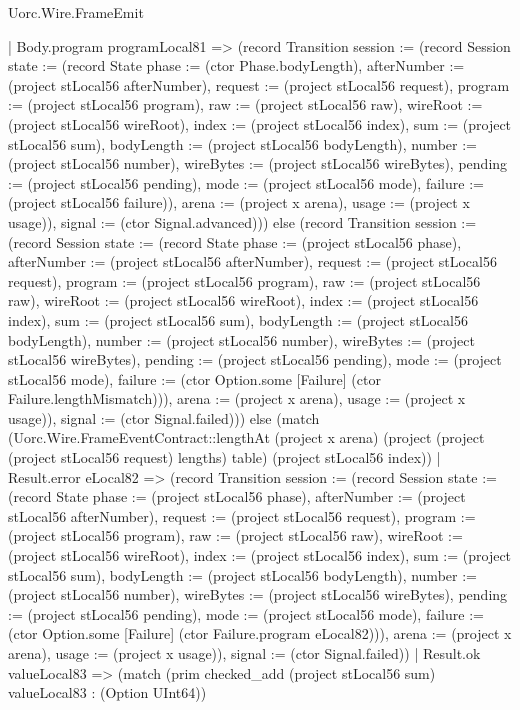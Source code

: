 \begin{lexlean}{Uorc.Wire.FrameEmit}
\begin{semanticmodule}
{          | Body.program programLocal81 => (record Transition {session := (record Session {state := (record State {phase := (ctor Phase.bodyLength), afterNumber := (project stLocal56 afterNumber), request := (project stLocal56 request), program := (project stLocal56 program), raw := (project stLocal56 raw), wireRoot := (project stLocal56 wireRoot), index := (project stLocal56 index), sum := (project stLocal56 sum), bodyLength := (project stLocal56 bodyLength), number := (project stLocal56 number), wireBytes := (project stLocal56 wireBytes), pending := (project stLocal56 pending), mode := (project stLocal56 mode), failure := (project stLocal56 failure)}), arena := (project x arena), usage := (project x usage)}), signal := (ctor Signal.advanced)})) else (record Transition {session := (record Session {state := (record State {phase := (project stLocal56 phase), afterNumber := (project stLocal56 afterNumber), request := (project stLocal56 request), program := (project stLocal56 program), raw := (project stLocal56 raw), wireRoot := (project stLocal56 wireRoot), index := (project stLocal56 index), sum := (project stLocal56 sum), bodyLength := (project stLocal56 bodyLength), number := (project stLocal56 number), wireBytes := (project stLocal56 wireBytes), pending := (project stLocal56 pending), mode := (project stLocal56 mode), failure := (ctor Option.some [Failure] (ctor Failure.lengthMismatch))}), arena := (project x arena), usage := (project x usage)}), signal := (ctor Signal.failed)})) else (match (Uorc.Wire.FrameEventContract::lengthAt (project x arena) (project (project (project stLocal56 request) lengths) table) (project stLocal56 index))
          | Result.error eLocal82 => (record Transition {session := (record Session {state := (record State {phase := (project stLocal56 phase), afterNumber := (project stLocal56 afterNumber), request := (project stLocal56 request), program := (project stLocal56 program), raw := (project stLocal56 raw), wireRoot := (project stLocal56 wireRoot), index := (project stLocal56 index), sum := (project stLocal56 sum), bodyLength := (project stLocal56 bodyLength), number := (project stLocal56 number), wireBytes := (project stLocal56 wireBytes), pending := (project stLocal56 pending), mode := (project stLocal56 mode), failure := (ctor Option.some [Failure] (ctor Failure.program eLocal82))}), arena := (project x arena), usage := (project x usage)}), signal := (ctor Signal.failed)})
          | Result.ok valueLocal83 => (match (prim checked_add (project stLocal56 sum) valueLocal83 : (Option UInt64))
}
\end{semanticmodule}
\end{lexlean}
